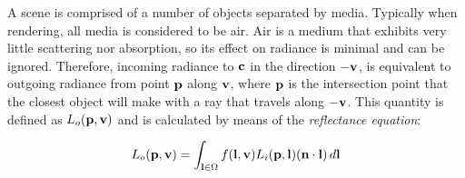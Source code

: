 A scene is comprised of a number of objects separated by media. Typically when rendering, all media is considered to be air. Air is a medium that exhibits very little scattering nor absorption, so its effect on radiance is minimal and can be ignored. Therefore, incoming radiance to \begin{math}\mathbf{c}\end{math} in the direction \begin{math}\mathbf{-v}\end{math}, is equivalent to outgoing radiance from point \begin{math}\mathbf{p}\end{math} along \begin{math}\mathbf{v}\end{math}, where \begin{math}\mathbf{p}\end{math} is the intersection point that the closest object will make with a ray that travels along \begin{math}\mathbf{-v}\end{math}. This quantity is defined as \begin{math}L_o(\mathbf{p}, \mathbf{v})\end{math} and is calculated by means of the \textit{reflectance equation}:

\begin{equation}
	L_o(\mathbf{p}, \mathbf{v}) = \int_{\mathbf{l}\in\Omega}f(\mathbf{l}, \mathbf{v})L_i(\mathbf{p}, \mathbf{l})(\mathbf{n}\cdot\mathbf{l})\,d\mathbf{l}
\end{equation}

